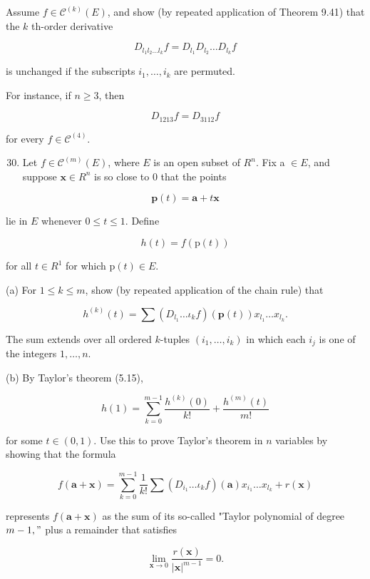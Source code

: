 \documentclass[10pt]{article}
\begin{document}
Assume $f \in \mathscr{C}^{(k)}(E)$, and show (by repeated application of Theorem 9.41) that the $k$ th-order derivative

$$
D_{l_{1} l_{2} \ldots l_{k}} f=D_{l_{1}} D_{l_{2}} \ldots D_{l_{k}} f
$$

is unchanged if the subscripts $i_{1}, \ldots, i_{k}$ are permuted.

For instance, if $n \geq 3$, then

$$
D_{1213} f=D_{3112} f
$$

for every $f \in \mathscr{C}^{(4)}$.

\begin{enumerate}
  \setcounter{enumi}{29}
  \item Let $f \in \mathscr{C}^{(m)}(E)$, where $E$ is an open subset of $R^{n}$. Fix a $\in E$, and suppose $\mathbf{x} \in R^{n}$ is so close to 0 that the points
\end{enumerate}

$$
\mathbf{p}(t)=\mathbf{a}+t \mathbf{x}
$$

lie in $E$ whenever $0 \leq t \leq 1$. Define

$$
h(t)=f(\mathrm{p}(t))
$$

for all $t \in R^{1}$ for which $\mathrm{p}(t) \in E$.

(a) For $1 \leq k \leq m$, show (by repeated application of the chain rule) that

$$
h^{(k)}(t)=\sum\left(D_{l_{1}} \ldots \iota_{k} f\right)(\mathbf{p}(t)) x_{l_{1}} \ldots x_{l_{k}} .
$$

The sum extends over all ordered $k$-tuples $\left(i_{1}, \ldots, i_{k}\right)$ in which each $i_{j}$ is one of the integers $1, \ldots, n$.

(b) By Taylor's theorem (5.15),

$$
h(1)=\sum_{k=0}^{m-1} \frac{h^{(k)}(0)}{k !}+\frac{h^{(m)}(t)}{m !}
$$

for some $t \in(0,1)$. Use this to prove Taylor's theorem in $n$ variables by showing that the formula

$$
f(\mathbf{a}+\mathbf{x})=\sum_{k=0}^{m-1} \frac{1}{k !} \sum\left(D_{i_{1}} \ldots \iota_{k} f\right)(\mathbf{a}) x_{i_{1}} \ldots x_{l_{k}}+r(\mathbf{x})
$$

represents $f(\mathbf{a}+\mathbf{x})$ as the sum of its so-called "Taylor polynomial of degree $m-1, "$ plus a remainder that satisfies

$$
\lim _{\mathbf{x} \rightarrow 0} \frac{r(\mathbf{x})}{|\mathbf{x}|^{m-1}}=0 .
$$
\end{document}
